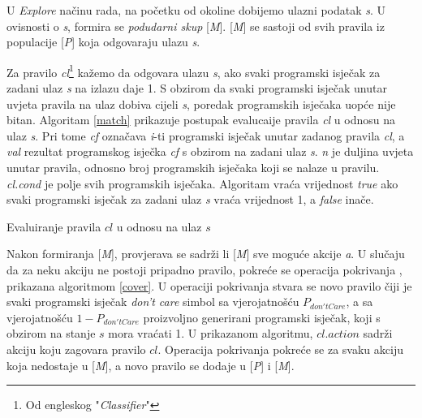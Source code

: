 \documentclass[times, utf8, zavrsni]{fer}
\begin{document}
U \emph{Explore} načinu rada, na početku od okoline dobijemo ulazni podatak \emph{s}.
U ovisnosti o \emph{s}, formira se \emph{podudarni skup}  [\emph{M}].
[\emph{M}] se sastoji od svih pravila iz populacije [\emph{P}] koja odgovaraju ulazu \emph{s}.

Za pravilo \emph{cl}\footnote{Od engleskog "\emph{Classifier}"} kažemo da odgovara ulazu \emph{s}, ako svaki programski isječak za zadani ulaz \emph{s} na izlazu daje 1.
S obzirom da svaki programski isječak unutar uvjeta pravila na ulaz dobiva cijeli \emph{s}, poredak programskih isječaka uopće nije bitan.
Algoritam \ref{match} prikazuje postupak evalucaije pravila \emph{cl} u odnosu na ulaz \emph{s}.
Pri tome \emph{cf} označava \emph{i}-ti programski isječak unutar zadanog pravila \emph{cl}, a \emph{val} rezultat programskog isječka \emph{cf} s obzirom na zadani ulaz \emph{s}.
\emph{n} je duljina uvjeta unutar pravila, odnosno broj programskih isječaka koji se nalaze u pravilu.
\emph{cl.cond} je polje svih programskih isječaka.
Algoritam vraća vrijednost \emph{true} ako svaki programski isječak za zadani ulaz \emph{s} vraća vrijednost 1, a \emph{false} inače.

\begin{algorithm}
\caption{Evaluiranje pravila $cl$ u odnosu na ulaz $s$}
\label{match}
\begin{algorithmic}
\ENDIF
\ENDFOR
{}
\end{algorithmic}
\end{algorithm}

Nakon formiranja [\emph{M}], provjerava se sadrži li [\emph{M}] sve moguće akcije \emph{a}.
U slučaju da za neku akciju ne postoji pripadno pravilo, pokreće se operacija pokrivanja , prikazana algoritmom \ref{cover}.
U operaciji pokrivanja stvara se novo pravilo čiji je svaki programski isječak \emph{don't care} simbol sa vjerojatnošću $P_{don'tCare}$, a sa vjerojatnošću $1 - P_{don'tCare}$ proizvoljno generirani programski isječak, koji s obzirom na stanje $s$ mora vraćati 1.
U prikazanom algoritmu, $cl.action$ sadrži akciju koju zagovara pravilo $cl$.
Operacija pokrivanja pokreće se za svaku akciju koja nedostaje u [\emph{M}], a novo pravilo se dodaje u  [\emph{P}] i [\emph{M}].
\end{document}
